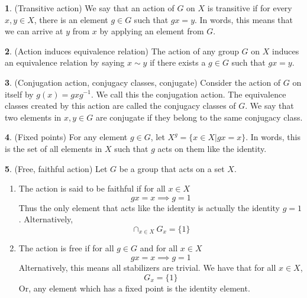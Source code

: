 \documentclass[12pt]{article}
\theoremstyle{definition}
\newtheorem{definition}{\color{NavyBlue}{\textbf{Definition}}}
\begin{document}
\begin{definition}(Transitive action)
We say that an action of $G$ on $X$ is transitive if for every $x,y \in X$, there is an element $g \in G$ such that $gx = y$. In words, this means that we can arrive at $y$ from $x$ by applying an element from $G$.
\end{definition}

\begin{definition}(Action induces equivalence relation)
The action of any group $G$ on $X$ induces an equivalence relation by saying $x \sim y$ if there exists a $g \in G$ such that $gx = y$.
\end{definition}

\begin{definition}(Conjugation action, conjugacy classes, conjugate)
Consider the action of $G$ on itself by $g(x) = gxg^{-1}$. We call this the conjugation action. The equivalence classes created by this action are called the conjugacy classes of $G$. We say that two elements in $x,y\in G$ are conjugate if they belong to the same conjugacy class.
\end{definition}

\begin{definition}(Fixed points)
For any element $g\in G$, let $X^g = \{x\in X|gx = x\}$. In words, this is the set of all elements in $X$ such that $g$ acts on them like the identity.
\end{definition}

\begin{definition}(Free, faithful action)
Let $G$ be a group that acts on a set $X$.
\begin{enumerate}
\item The action is said to be faithful if for all $x \in X$
\begin{equation}
gx = x \implies g = 1
\end{equation}
Thus the only element that acts like the identity is actually the identity $g=1$. Alternatively,
\begin{equation}
\cap_{x \in X} G_x = \{1\}
\end{equation}
\item The action is free if for all $g\in G$ and for all $x \in X$
\begin{equation}
gx = x \implies g = 1
\end{equation}
Alternatively, this means all stabilizers are trivial. We have that for all $x \in X$,
\begin{equation}
G_x = \{1\}
\end{equation}
 Or, any element which has a fixed point is the identity element.
\end{enumerate}
\end{definition}
\end{document}
